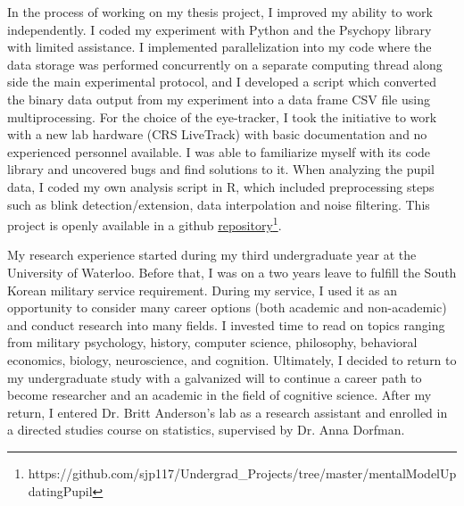 \documentclass[12pt]{article}
\begin{document}
	In the process of working on my thesis project, I improved my ability to work independently. I coded my experiment with Python and the Psychopy library with limited assistance. I implemented parallelization into my code where the data storage was performed concurrently on a separate computing thread along side the main experimental protocol, and I developed a script which converted the binary data output from my experiment into a data frame CSV file using multiprocessing. For the choice of the eye-tracker, I took the initiative to work with a new lab hardware (CRS LiveTrack) with basic documentation and no experienced personnel available. I was able to familiarize myself with its code library and uncovered bugs and find solutions to it. When analyzing the pupil data, I coded my own analysis script in R, which included preprocessing steps such as blink detection/extension, data interpolation and noise filtering. This project is openly available in a github \href{https://github.com/sjp117/Undergrad_Projects/tree/master/mentalModelUpdatingPupil}{repository}\footnote{https://github.com/sjp117/Undergrad\_Projects/tree/master/mentalModelUpdatingPupil}.
	
	My research experience started during my third undergraduate year at the University of Waterloo. Before that, I was on a two years leave to fulfill the South Korean military service requirement. During my service, I used it as an opportunity to consider many career options (both academic and non-academic) and conduct research into many fields. I invested time to read on topics ranging from military psychology, history, computer science, philosophy, behavioral economics, biology, neuroscience, and cognition. Ultimately, I decided to return to my undergraduate study with a galvanized will to continue a career path to become researcher and an academic in the field of cognitive science. After my return, I entered Dr. Britt Anderson's lab as a research assistant and enrolled in a directed studies course on statistics, supervised by Dr. Anna Dorfman.
	
\end{document}
